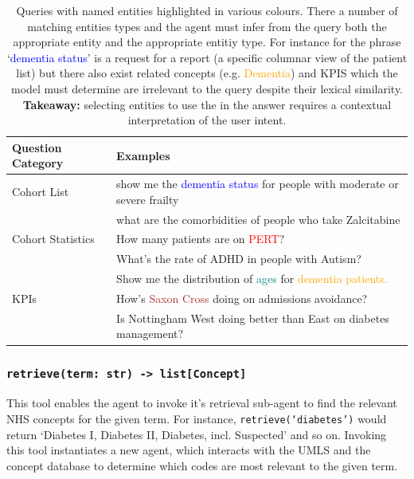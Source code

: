 \documentclass[11pt]{article}
\begin{document}
\begin{table}[t]
\centering
\begin{tabular}{|p{2cm}|p{5cm}|}
\hline
	Question Category & Examples \\
\hline
\hline
	Cohort List	& show me the \textcolor{blue}{dementia status} for people with moderate or severe frailty \\
			& what are the comorbidities of people who take Zalcitabine \\ 
\hline
	Cohort Statistics 	& How many patients are on \textcolor{red}{PERT}? \\
				& What's the rate of ADHD in people with Autism? \\
				& Show me the distribution of \textcolor{teal}{ages} for \textcolor{orange}{dementia patients.} \\
\hline
	KPIs 	& How's \textcolor{brown}{Saxon Cross} doing on admissions avoidance? \\
		& Is Nottingham West doing better than East on diabetes management? \\
\hline
\end{tabular}
\caption{
	Queries with named entities highlighted in various colours.
	There a number of matching entities types and the agent must infer from the query both the appropriate entity and the appropriate entitiy type.
	For instance for the phrase `\textcolor{blue}{dementia status}' is a request for a report (a specific columnar view of the patient list) but there also exist related
	concepts (e.g. \textcolor{orange}{Dementia}) and KPIS which the model must determine are irrelevant to the query despite their lexical similarity.
	\\ \textbf{Takeaway:} selecting entities to use the in the answer requires a contextual interpretation of the user intent.  
}
\label{tab:sample-queries}
\end{table}

\subsubsection*{\texttt{retrieve(term: str) -> list[Concept]}}
This tool enables the agent to invoke it's retrieval sub-agent to find the relevant NHS concepts for the given term.
For instance, \texttt{retrieve(`diabetes')} would return `Diabetes I, Diabetes II, Diabetes, incl. Suspected' and so on.
Invoking this tool instantiates a new agent, which interacts with the UMLS and the concept database to determine which codes are most relevant to the given term.
\end{document}
